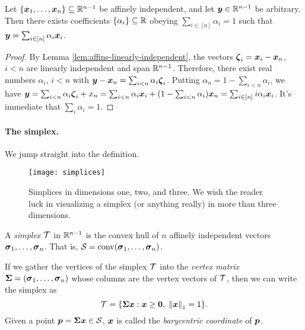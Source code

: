 \begin{lemma}
	\label{lem:barycentric_coeffs}
	Let $\{\vb*{x}_1,\dots,\vb*{x}_n\}\subseteq\mathbb{R}^{n-1}$ be affinely independent, and let  $\vb*{y}\in\mathbb{R}^{n-1}$ be arbitrary. Then there exists coefficients $\{\alpha_i\}\subseteq\mathbb{R}$ obeying $\sum_{i\in[n]}\alpha_i=1$ such that $\vb*{y}=\sum_{i\in[n]}\alpha_i\vb*{x}_i$. 
\end{lemma}
\begin{proof}
	By Lemma \ref{lem:affine-linearly-independent}, the vectors $\vb*{\zeta}_i=\vb*{x}_i-\vb*{x}_n$, $i<n$ are linearly independent and span $\mathbb{R}^{n-1}$. Therefore, there exist real numbers $\alpha_i$, $i<n$ with $\vb*{y}-\vb*{x}_n = \sum_{i<n} \alpha_i\vb*{\zeta}_i$. Putting $\alpha_n=1-\sum_{i<n}\alpha_i$, we have $\vb*{y}=\sum_{i<n}\alpha_i\vb*{\zeta}_i + x_n = \sum_{i<n} \alpha_i\vb*{x}_i + (1-\sum_{i<n}\alpha_i)\vb*{x}_n = \sum_{i\in[n]}i \alpha_i\vb*{x}_i$. It's immediate that $\sum_i\alpha_i=1$. 
\end{proof}

\paragraph{The simplex.} 
We jump straight into the definition. 
\begin{figure}
	\centering
	\texttt{[image: simplices]}
	\caption{Simplices in dimensions one, two, and three. We wish the reader luck in visualizing a simplex (or anything really) in more than three dimensions.}
\end{figure}


\begin{definition}
\label{def:simplex}
A \emph{simplex} $\mathcal{T}$ in $\mathbb{R}^{n-1}$ is the convex hull of $n$ affinely independent vectors $\vb*{\sigma}_1,\dots,\vb*{\sigma}_n$. That is, $\mathcal{S}=\textnormal{conv}(\vb*{\sigma}_1,\dots,\vb*{\sigma}_n)$.  
\end{definition}

If we gather the vertices of the simplex $\mathcal{T}$ into the \emph{vertex matrix} $\boldsymbol{\Sigma}=(\vb*{\sigma}_1,\dots,\vb*{\sigma}_n)$ whose columns are the vertex vectors of $\mathcal{T}$, then we can write the simplex as 
\begin{equation*}
    \mathcal{T} = \{\boldsymbol{\Sigma} \vb*{x}:\vb*{x}\geq \vb{0}, \; \norm{\vb*{x}}_1=1\}.
\end{equation*}
Given a point $\vb*{p}=\boldsymbol{\Sigma}\vb*{x}\in\mathcal{S}$, $\vb*{x}$ is called the \emph{barycentric coordinate} of $\vb*{p}$.  

